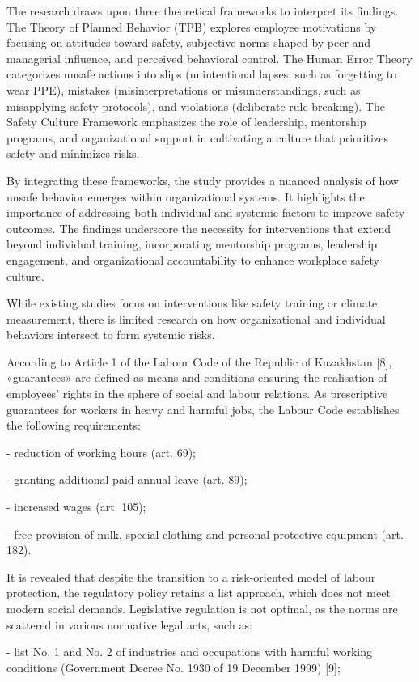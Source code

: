 \begin{multicols}{2}
The research draws upon three theoretical frameworks to interpret its
findings. The Theory of Planned Behavior (TPB) explores employee
motivations by focusing on attitudes toward safety, subjective norms
shaped by peer and managerial influence, and perceived behavioral
control. The Human Error Theory categorizes unsafe actions into slips
(unintentional lapses, such as forgetting to wear PPE), mistakes
(misinterpretations or misunderstandings, such as misapplying safety
protocols), and violations (deliberate rule-breaking). The Safety
Culture Framework emphasizes the role of leadership, mentorship
programs, and organizational support in cultivating a culture that
prioritizes safety and minimizes risks.

By integrating these frameworks, the study provides a nuanced analysis
of how unsafe behavior emerges within organizational systems. It
highlights the importance of addressing both individual and systemic
factors to improve safety outcomes. The findings underscore the
necessity for interventions that extend beyond individual training,
incorporating mentorship programs, leadership engagement, and
organizational accountability to enhance workplace safety culture.

While existing studies focus on interventions like safety training or
climate measurement, there is limited research on how organizational and
individual behaviors intersect to form systemic risks.

According to Article 1 of the Labour Code of the Republic of Kazakhstan
{[}8{]}, «guarantees» are defined as means and conditions ensuring the
realisation of employees'{} rights in the sphere of
social and labour relations. As prescriptive guarantees for workers in
heavy and harmful jobs, the Labour Code establishes the following
requirements:

- reduction of working hours (art. 69);

- granting additional paid annual leave (art. 89);

- increased wages (art. 105);

- free provision of milk, special clothing and personal protective
equipment (art. 182).

It is revealed that despite the transition to a risk-oriented model of
labour protection, the regulatory policy retains a list approach, which
does not meet modern social demands. Legislative regulation is not
optimal, as the norms are scattered in various normative legal acts,
such as:

- list No. 1 and No. 2 of industries and occupations with harmful
working conditions (Government Decree No. 1930 of 19 December 1999)
{[}9{]};


\end{multicols}

